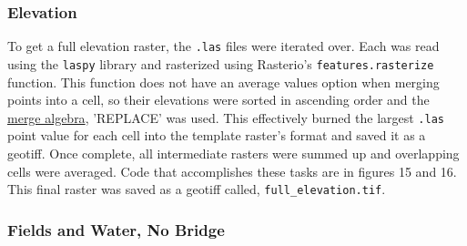 \documentclass[article,12pt]{article}
\numberwithin{equation}{section}
\begin{document}
\subsubsection{Elevation}

To get a full elevation raster, the \texttt{.las} files were iterated over. Each was read using the \texttt{laspy} library and rasterized using Rasterio's \texttt{features.rasterize} function. This function does not have an average values option when merging points into a cell, so their elevations were sorted in ascending order and the \href{https://rasterio.readthedocs.io/en/latest/api/rasterio.enums.html#rasterio.enums.MergeAlg}{merge algebra}, 'REPLACE' was used. This effectively burned the largest \texttt{.las} point value for each cell into the template raster's format and saved it as a geotiff. Once complete, all intermediate rasters were summed up and overlapping cells were averaged. Code that accomplishes these tasks are in figures 15 and 16. This final raster was saved as a geotiff called, \texttt{full\_elevation.tif}.
\newpage
		\\
	\begin{center}
	\end{center}

\subsubsection{Fields and Water, No Bridge}
\end{document}
